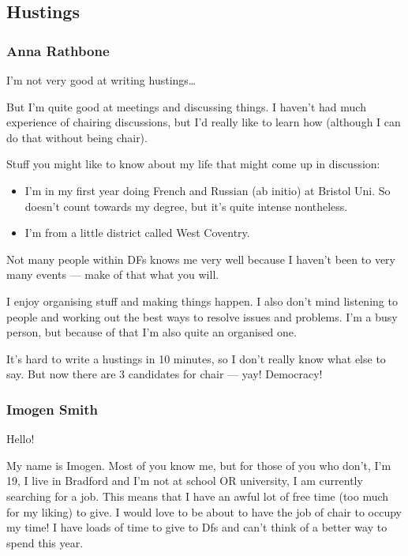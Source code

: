 \documentclass[a4paper, 11pt]{article} %
\begin{document}
\subsection{Hustings}

\begin{onehalfspacing}
\subsubsection{Anna Rathbone}
I'm not very good at writing hustings\ldots

But I'm quite good at meetings and discussing things.  I haven't had much experience of chairing discussions, but I'd really like to learn how (although I can do that without being chair).

Stuff you might like to know about my life that might come up in discussion:

\begin{itemize}
\item I'm in my first year doing French and Russian (ab initio) at Bristol Uni.  So doesn't count towards my degree, but it's quite intense nontheless.
\item I'm from a little district called West Coventry.
\end{itemize}

Not many people within DFs knows me very well because I haven't been to very many events --- make of that what you will.

I enjoy organising stuff and making things happen.  I also don't mind listening to people and working out the best ways to resolve issues and problems.  I'm a busy person, but because of that I'm also quite an organised one.

It's hard to write a hustings in 10 minutes, so I don't really know what else to say.  But now there are 3 candidates for chair --- yay!  Democracy!

\subsubsection{Imogen Smith}
Hello!

My name is Imogen. Most of you know me, but for those of you who don't, I'm 19, I live in Bradford and I'm not at school OR university, I am currently searching for a job. This means that I have an awful lot of free time (too much for my liking) to give. I would love to be about to have the job of chair to occupy my time! I have loads of time to give to Dfs and can't think of a better way to spend this year.


\end{onehalfspacing}
\end{document}

